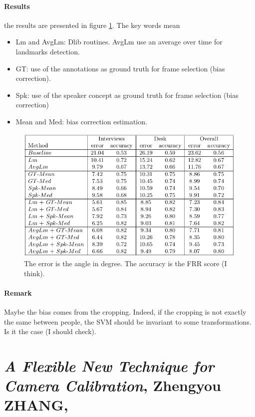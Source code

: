 \documentclass[11pt,a4paper]{article}
\begin{document}
\paragraph{Results}
the results are presented in figure \ref{ResultsYu}. The key words mean
\begin{itemize}
\item Lm and AvgLm: Dlib routines. AvgLm use an average over time for landmarks detection.
\item GT: use of the annotations as ground truth for frame selection (bias correction).
\item Spk: use of the speaker concept as ground truth for frame selection (bias correction)
\item Mean and Med: bias correction estimation.
\end{itemize}
\begin{figure}[!th]
\centering
\includegraphics[scale=0.6]{./Pictures/ResultsYu.png}
\caption{The error is the angle in degree. The accuracy is the FRR score (I think). \label{ResultsYu}}
\end{figure}

\paragraph{Remark} Maybe the bias comes from the cropping. Indeed, if the cropping is not exactly the same between people, the SVM should be invariant to some transformations. Is it the case (I should check).

\clearpage
\section{\textit{A Flexible New Technique for Camera Calibration}, Zhengyou ZHANG, \cite{Zhang2000}}
\end{document}
